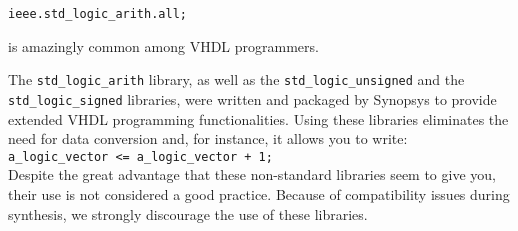 \noindent
\texttt{ieee.std\_logic\_arith.all;}

\noindent
is amazingly common among VHDL programmers.

The \texttt{std\_logic\_arith} library, as well as the \texttt{std\_logic\_unsigned} and the \texttt{std\_logic\_signed} libraries, were written and packaged by Synopsys to provide extended VHDL programming functionalities. Using these libraries eliminates the need for data conversion and, for instance, it allows you to write:\\
\texttt{a\_logic\_vector <= a\_logic\_vector + 1;}\\
Despite the great advantage that these non-standard libraries seem to give you, their use is not considered a good practice. Because of compatibility issues during synthesis, we strongly discourage the use of these libraries.

% 

%
%
%
%
%
% 
% 




